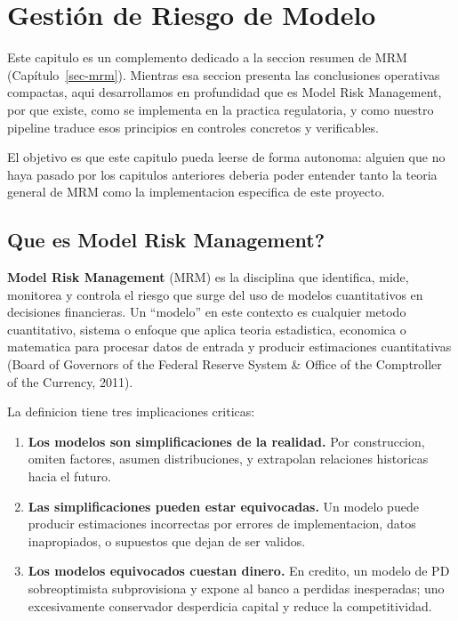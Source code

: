 \documentclass[
  spanish,
  11pt,
  letterpaper,
]{scrbook}
\providecommand{\tightlist}{%
  \setlength{\itemsep}{0pt}\setlength{\parskip}{0pt}}
\theoremstyle{plain}
\theoremstyle{remark}
\begin{document}
\section{Gestión de Riesgo de Modelo}\label{sec-mrm-deep-dive}

Este capitulo es un complemento dedicado a la seccion resumen de MRM
(Capítulo~\ref{sec-mrm}). Mientras esa seccion presenta las conclusiones
operativas compactas, aqui desarrollamos en profundidad que es Model
Risk Management, por que existe, como se implementa en la practica
regulatoria, y como nuestro pipeline traduce esos principios en
controles concretos y verificables.

El objetivo es que este capitulo pueda leerse de forma autonoma: alguien
que no haya pasado por los capitulos anteriores deberia poder entender
tanto la teoria general de MRM como la implementacion especifica de este
proyecto.

\subsection{Que es Model Risk Management?}\label{sec-mrm-definition}

\textbf{Model Risk Management} (MRM) es la disciplina que identifica,
mide, monitorea y controla el riesgo que surge del uso de modelos
cuantitativos en decisiones financieras. Un ``modelo'' en este contexto
es cualquier metodo cuantitativo, sistema o enfoque que aplica teoria
estadistica, economica o matematica para procesar datos de entrada y
producir estimaciones cuantitativas (Board of Governors of the Federal
Reserve System \& Office of the Comptroller of the Currency, 2011).

La definicion tiene tres implicaciones criticas:

\begin{enumerate}
\def\labelenumi{\arabic{enumi}.}
\tightlist
\item
  \textbf{Los modelos son simplificaciones de la realidad.} Por
  construccion, omiten factores, asumen distribuciones, y extrapolan
  relaciones historicas hacia el futuro.
\item
  \textbf{Las simplificaciones pueden estar equivocadas.} Un modelo
  puede producir estimaciones incorrectas por errores de implementacion,
  datos inapropiados, o supuestos que dejan de ser validos.
\item
  \textbf{Los modelos equivocados cuestan dinero.} En credito, un modelo
  de PD sobreoptimista subprovisiona y expone al banco a perdidas
  inesperadas; uno excesivamente conservador desperdicia capital y
  reduce la competitividad.
\end{enumerate}
\end{document}
